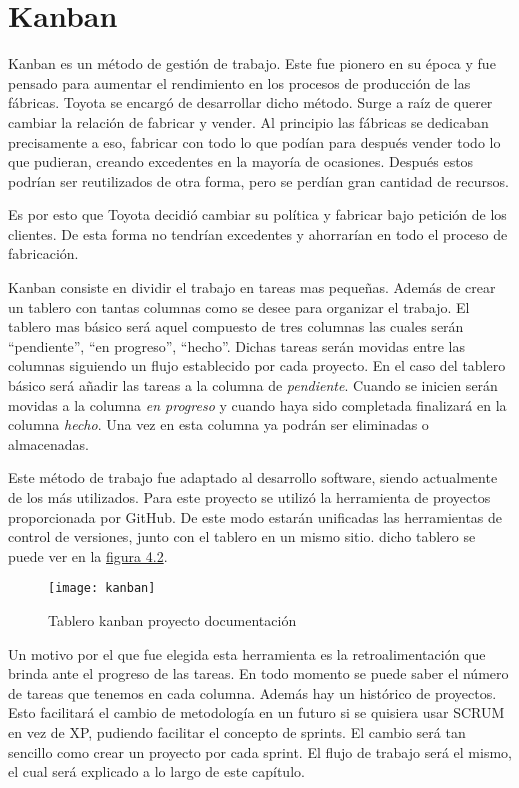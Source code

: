 \section{Kanban}

Kanban es un método de gestión de trabajo. Este fue pionero en su época y fue pensado para
aumentar el rendimiento en los procesos de producción de las fábricas. Toyota se encargó
de desarrollar dicho método. Surge a raíz de querer cambiar la relación de fabricar y vender.
Al principio las fábricas se dedicaban precisamente a eso, fabricar con todo lo que podían
para después vender todo lo que pudieran, creando excedentes en la mayoría de ocasiones. Después
estos podrían ser reutilizados de otra forma, pero se perdían gran cantidad de recursos.

Es por esto que Toyota decidió cambiar su política y fabricar bajo petición de los clientes. De
esta forma no tendrían excedentes y ahorrarían en todo el proceso de fabricación.

Kanban consiste en dividir el trabajo en tareas mas pequeñas. Además de crear un tablero
con tantas columnas como se desee para organizar el trabajo.
El tablero mas básico será aquel compuesto de tres columnas las cuales serán \enquote{pendiente},
\enquote{en progreso}, \enquote{hecho}. Dichas tareas serán movidas entre las columnas siguiendo un flujo
establecido por cada proyecto. En el caso del tablero básico será añadir las tareas a la columna
de \textit{pendiente}. Cuando se inicien serán movidas a la columna \textit{en progreso} y cuando haya sido completada
finalizará en la columna \textit{hecho}. Una vez en esta columna ya podrán ser eliminadas o
almacenadas.

Este método de trabajo fue adaptado al desarrollo software, siendo actualmente de los más utilizados.
Para este proyecto se utilizó la herramienta de proyectos proporcionada por GitHub. De este modo
estarán unificadas las herramientas de control de versiones, junto con el tablero en un mismo sitio.
dicho tablero se puede ver en la \hyperref[fig:Tablero kanban proyecto documentación]{figura 4.2}.

\begin{figure}[htb]
  \centering
    \texttt{[image: kanban]}
  \caption[Tablero kanban proyecto documentación]{Tablero kanban proyecto documentación}
  \label{fig:Tablero kanban proyecto documentación}
\end{figure}

Un motivo por el que fue elegida esta herramienta es la retroalimentación que brinda ante
el progreso de las tareas. En todo momento se puede saber el número de tareas que tenemos
en cada columna. Además hay un histórico de proyectos. Esto facilitará el cambio de metodología
en un futuro si se quisiera usar SCRUM en vez de XP, pudiendo facilitar
el concepto de sprints. El cambio será tan sencillo como crear un proyecto por cada sprint.
El flujo de trabajo será el mismo, el cual será explicado a lo largo de este capítulo.


